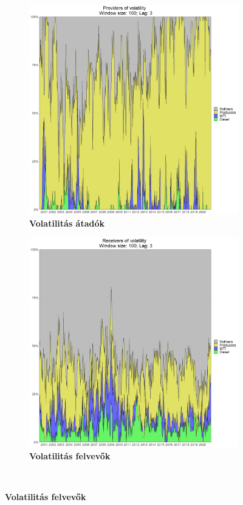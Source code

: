 \documentclass[12pt,bibliography=totoc]{article}
\begin{document}
\begin{figure}[H]
\centering
\caption{A volatilitás terjedése dinamikusan ábrázolva és szereplőkként csoportosítva}
\begin{subfigure}{.5\linewidth}
\centering
\includegraphics[width=\linewidth]{provv}
\caption{\textbf{Volatilitás átadók}}

\end{subfigure}%
\begin{subfigure}{.5\linewidth}
\centering
\includegraphics[width=\linewidth]{recc}
\caption{\textbf{Volatilitás felvevők}}
\end{subfigure}\\[1ex]
\end{figure}
\end{document}
